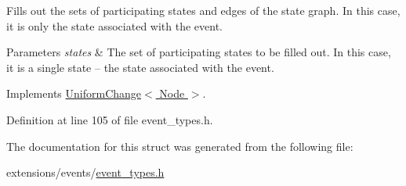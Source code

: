 Fills out the sets of participating states and edges of the state graph. In this case, it is only the state associated with the event. 


\begin{DoxyParams}{Parameters}
{\em states} & The set of participating states to be filled out. In this case, it is a single state -- the state associated with the event. \\
\hline
\end{DoxyParams}


Implements \hyperlink{structUniformChange_aabe64e47649e99afee7a67969eb98c90}{Uniform\+Change$<$ Node $>$}.



Definition at line 105 of file event\+\_\+types.\+h.



The documentation for this struct was generated from the following file\+:\begin{DoxyCompactItemize}
\item 
extensions/events/\hyperlink{event__types_8h}{event\+\_\+types.\+h}\end{DoxyCompactItemize}
